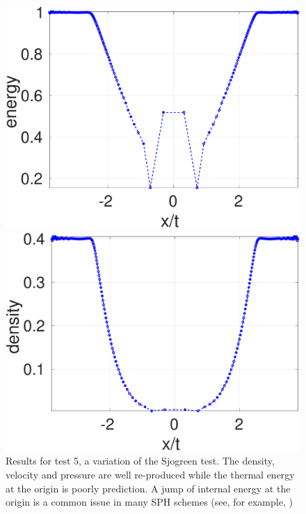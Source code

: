 \begin{figure}
\begin{minipage}{.495\textwidth}
        \includegraphics[width=0.99 \textwidth]{Chapter-4/Figures/Sjogreen/Sjogreen-RCM-e-Adpt1}
    \end{minipage}%
    \begin{minipage}{.495 \textwidth}
        \centering
        \includegraphics[width=0.99 \textwidth]{Chapter-4/Figures/Sjogreen/Sjogreen-RCM-p-Adpt1}
    \end{minipage}%
    \caption{Results for test 5, a variation of the Sjogreen test. The density, velocity and pressure are well re-produced while the thermal energy at the origin is poorly prediction. A jump of internal energy at the origin is a common issue in many SPH schemes (see, for example, \citep{monaghan1997sph,cha2003implementations,puri2014approximate})}
    \label{fig:RCM-Sjogreen}
\end{figure}

